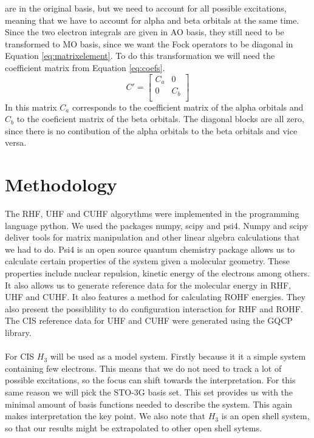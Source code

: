 \documentclass[twoside,twocolumn,9pt]{article}
\begin{document}
are in the original basis, but we need to account for all possible excitations, meaning that we have to account for alpha and beta orbitals at the same time. Since the two electron
integrals are given in AO basis, they still need to be transformed to MO basis, since we want the Fock operators to be diagonal in Equation \eqref{eq:matrixelement}. To do this
transformation we will need the coefficient matrix from Equation \eqref{eq:coefs}.
\begin{equation}\label{eq:coefs}
  C' = \begin{bmatrix}
    C_a & 0   \\
    0   & C_b \\
  \end{bmatrix}
\end{equation}
In this matrix $C_a$ corresponds to the coefficient matrix of the alpha orbitals and $C_b$ to the coeficient matrix of the beta orbitals. The diagonal blocks are all zero, since there
is no contibution of the alpha orbitals to the beta orbitals and vice versa.


\section{Methodology}
\label{sec:method}
The RHF, UHF and CUHF algorythms were implemented in the programming language python. We used the packages numpy, scipy and psi4. Numpy and scipy deliver tools for matrix manipulation
and other linear algebra calculations that we had to do. Psi4 is an open source quantum chemistry package allows us to calculate certain properties of the system given a molecular
geometry. These properties include nuclear repulsion, kinetic energy of the electrons among others. It also allows us to generate reference data for the molecular energy in RHF, UHF
and CUHF. It also features a method for calculating ROHF energies. They also present the possiblility to do configuration interaction for RHF and ROHF. The CIS reference data for
UHF and CUHF were generated using the GQCP library.
\paragraph*{}
For CIS $H_3$ will be used as a model system. Firstly because it it a simple system containing few electrons. This means that we do not need to track a lot of possible excitations, so
the focus can shift towards the interpretation. For this same reason we will pick the STO-3G basis set. This set provides us with the minimal amount of basis functions needed to
describe the system. This again makes interpretation the key point. We also note that $H_3$ is an open shell system, so that our results might be extrapolated to other open shell
sytems.
\end{document}
